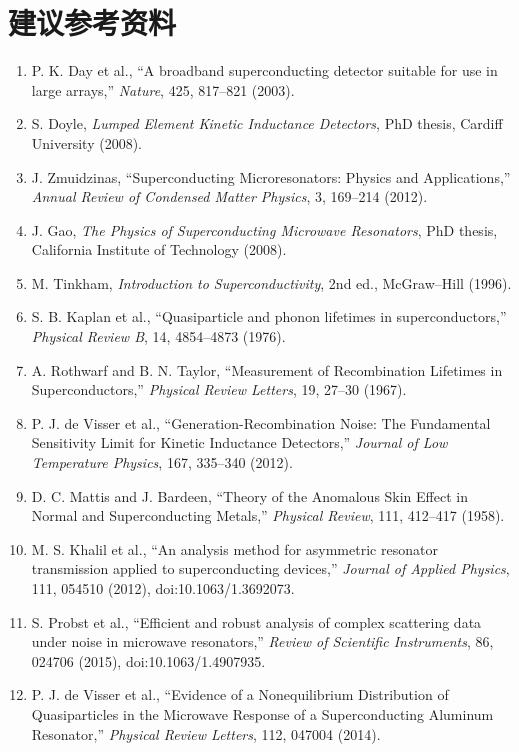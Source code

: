 \documentclass[11pt,a4paper,openany]{ctexrep}
\begin{document}
\chapter*{建议参考资料}
\begin{enumerate}
  \item P. K. Day et al., ``A broadband superconducting detector suitable for use in large arrays,'' \textit{Nature}, 425, 817--821 (2003).
  \item S. Doyle, \textit{Lumped Element Kinetic Inductance Detectors}, PhD thesis, Cardiff University (2008).
  \item J. Zmuidzinas, ``Superconducting Microresonators: Physics and Applications,'' \textit{Annual Review of Condensed Matter Physics}, 3, 169--214 (2012).
  \item J. Gao, \textit{The Physics of Superconducting Microwave Resonators}, PhD thesis, California Institute of Technology (2008).
  \item M. Tinkham, \textit{Introduction to Superconductivity}, 2nd ed., McGraw--Hill (1996).
  \item S. B. Kaplan et al., ``Quasiparticle and phonon lifetimes in superconductors,'' \textit{Physical Review B}, 14, 4854--4873 (1976).
  \item A. Rothwarf and B. N. Taylor, ``Measurement of Recombination Lifetimes in Superconductors,'' \textit{Physical Review Letters}, 19, 27--30 (1967).
  \item P. J. de Visser et al., ``Generation-Recombination Noise: The Fundamental Sensitivity Limit for Kinetic Inductance Detectors,'' \textit{Journal of Low Temperature Physics}, 167, 335--340 (2012).
  \item D. C. Mattis and J. Bardeen, ``Theory of the Anomalous Skin Effect in Normal and Superconducting Metals,'' \textit{Physical Review}, 111, 412--417 (1958).
  \item M. S. Khalil et al., ``An analysis method for asymmetric resonator transmission applied to superconducting devices,'' \textit{Journal of Applied Physics}, 111, 054510 (2012), doi:10.1063/1.3692073.
  \item S. Probst et al., ``Efficient and robust analysis of complex scattering data under noise in microwave resonators,'' \textit{Review of Scientific Instruments}, 86, 024706 (2015), doi:10.1063/1.4907935.
  \item P. J. de Visser et al., ``Evidence of a Nonequilibrium Distribution of Quasiparticles in the Microwave Response of a Superconducting Aluminum Resonator,'' \textit{Physical Review Letters}, 112, 047004 (2014).

\end{enumerate}
\end{document}
